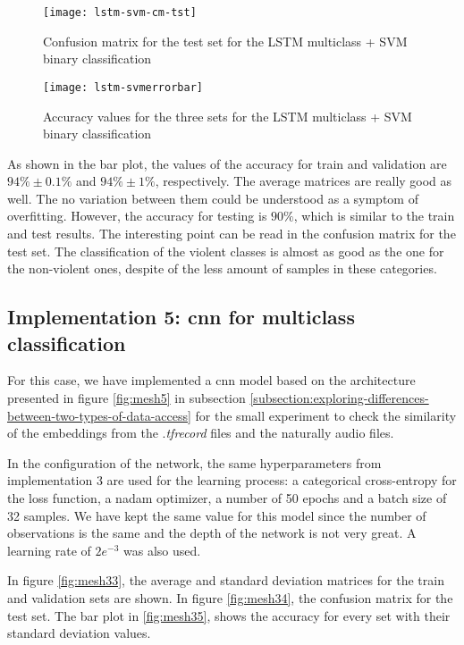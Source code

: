 	\begin{figure}[H]
		\centering
		\captionsetup{justification=centering}
		\texttt{[image: lstm-svm-cm-tst]}
		\caption{Confusion matrix for the test set for the LSTM multiclass + SVM binary classification}
		\label{fig:mesh31}
	\end{figure}
	
	\begin{figure}[H]
		\centering
		\captionsetup{justification=centering}
		\texttt{[image: lstm-svmerrorbar]}
		\caption{Accuracy values for the three sets for the LSTM multiclass + SVM binary classification}
		\label{fig:mesh32}
	\end{figure}

	As shown in the bar plot, the values of the accuracy for train and validation are $94\% \pm 0.1\%$ and $94\% \pm 1\%$, respectively. The average matrices are really good as well. The no variation between them could be understood as a symptom of overfitting. However, the accuracy for testing is $90\%$, which is similar to the train and test results. The interesting point can be read in the confusion matrix for the test set. The classification of the violent classes is almost as good as the one for the non-violent ones, despite of the less amount of samples in these categories. 
	
\subsection{Implementation 5: \acrshort{cnn} for multiclass classification}

	For this case, we have implemented a \acrshort{cnn} model based on the architecture presented in figure \ref{fig:mesh5} in subsection \ref{subsection:exploring-differences-between-two-types-of-data-access} for the small experiment to check the similarity of the embeddings from the .\textit{tfrecord} files and the naturally audio files.
	
	In the configuration of the network, the same hyperparameters from implementation 3 are used for the learning process: a categorical cross-entropy for the loss function, a \acrshort{nadam} optimizer, a number of 50 epochs and a batch size of 32 samples. We have kept the same value for this model since the number of observations is the same and the depth of the network is not very great. A learning rate of $2e^{-3}$ was also used. 
	
	In figure \ref{fig:mesh33}, the average and standard deviation matrices for the train and validation sets are shown. In figure \ref{fig:mesh34}, the confusion matrix for the test set. The bar plot in \ref{fig:mesh35}, shows the accuracy for every set with their standard deviation values.
	
